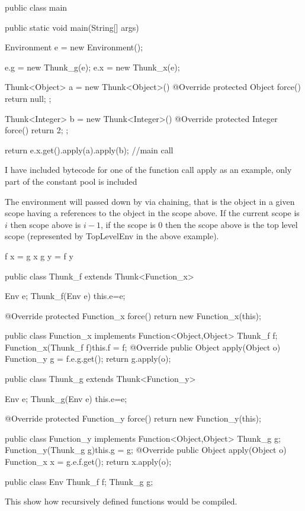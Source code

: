 \documentclass[12pt,a4paper,twoside]{article}
\begin{document}
\begin{JavaLst}
public class main {
    public static void main(String[] args) {
        Environment e = new Environment();

        e.g = new Thunk_g(e);
        e.x = new Thunk_x(e);

        Thunk<Object> a = new Thunk<Object>() {
            @Override
            protected Object force() {
                return null;
            }
        };

        Thunk<Integer> b = new Thunk<Integer>() {
            @Override
            protected Integer force() {
                return 2;
            }
        };
        
        return e.x.get().apply(a).apply(b); //main call
    }
}
\end{JavaLst}

I have included bytecode for one of the function call apply as an example, only part of the constant pool is
included


The environment will passed down by via chaining, that is the object in a given scope
having a references to the object in the scope above. If the current scope is $i$ then scope above is
$i-1$, if the scope is $0$ then the scope above is the top level scope (represented by TopLevelEnv in the above example).

\begin{JavaLst}
f x = g x
g y = f y

public class Thunk_f extends Thunk<Function_x> {
    Env e;
    Thunk_f(Env e) {this.e=e;}

    @Override
    protected Function_x force() {
        return new Function_x(this);
    }
}

public class Function_x implements Function<Object,Object> {
    Thunk_f f;
    Function_x(Thunk_f f){this.f = f;}
    @Override
    public Object apply(Object o) {
        Function_y g = f.e.g.get();
        return g.apply(o);
    }
}

public class Thunk_g extends Thunk<Function_y> {
    Env e;
    Thunk_g(Env e) {this.e=e;}

    @Override
    protected Function_y force() {
        return new Function_y(this);
    }
}

public class Function_y implements Function<Object,Object> {
    Thunk_g g;
    Function_y(Thunk_g g){this.g = g;}
    @Override
    public Object apply(Object o) {
        Function_x x = g.e.f.get();
        return x.apply(o);
    }
}

public class Env {
    Thunk_f f;
    Thunk_g g;
}
\end{JavaLst}

This show how recursively defined functions would be compiled.
\end{document}
